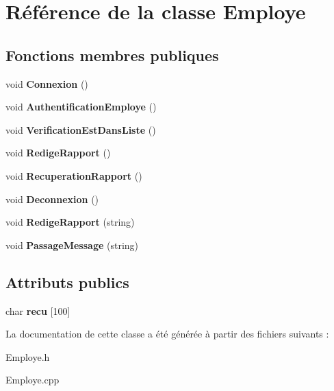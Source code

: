 \hypertarget{class_employe}{\section{Référence de la classe Employe}
\label{class_employe}
}
\subsection*{Fonctions membres publiques}
\begin{DoxyCompactItemize}
\item 
\hypertarget{class_employe_ab133ea7f87ed1fe42f84b9b733567722}{void {\bfseries Connexion} ()}\label{class_employe_ab133ea7f87ed1fe42f84b9b733567722}

\item 
\hypertarget{class_employe_aaef2ea495679ab80403b116e4618b4e8}{void {\bfseries Authentification\-Employe} ()}\label{class_employe_aaef2ea495679ab80403b116e4618b4e8}

\item 
\hypertarget{class_employe_af2c0ffa01a31c4fc7399f304609358af}{void {\bfseries Verification\-Est\-Dans\-Liste} ()}\label{class_employe_af2c0ffa01a31c4fc7399f304609358af}

\item 
\hypertarget{class_employe_a1334cc9524ed8018b3addb456e855d7c}{void {\bfseries Redige\-Rapport} ()}\label{class_employe_a1334cc9524ed8018b3addb456e855d7c}

\item 
\hypertarget{class_employe_ad9b36ebdafb48129b90c51f4f40d3e75}{void {\bfseries Recuperation\-Rapport} ()}\label{class_employe_ad9b36ebdafb48129b90c51f4f40d3e75}

\item 
\hypertarget{class_employe_a8c8fd0b2b74e124fd8df67660f0a5ae9}{void {\bfseries Deconnexion} ()}\label{class_employe_a8c8fd0b2b74e124fd8df67660f0a5ae9}

\item 
\hypertarget{class_employe_a9613d44ee61044ddd8b107f8d31bf18e}{void {\bfseries Redige\-Rapport} (string)}\label{class_employe_a9613d44ee61044ddd8b107f8d31bf18e}

\item 
\hypertarget{class_employe_afa2e71f67f5e1a0f86cf2b7004a46546}{void {\bfseries Passage\-Message} (string)}\label{class_employe_afa2e71f67f5e1a0f86cf2b7004a46546}

\end{DoxyCompactItemize}
\subsection*{Attributs publics}
\begin{DoxyCompactItemize}
\item 
\hypertarget{class_employe_a7a87458ff5c63d80a89a1c788938bd0b}{char {\bfseries recu} \mbox{[}100\mbox{]}}\label{class_employe_a7a87458ff5c63d80a89a1c788938bd0b}

\end{DoxyCompactItemize}


La documentation de cette classe a été générée à partir des fichiers suivants \-:\begin{DoxyCompactItemize}
\item 
Employe.\-h\item 
Employe.\-cpp\end{DoxyCompactItemize}
